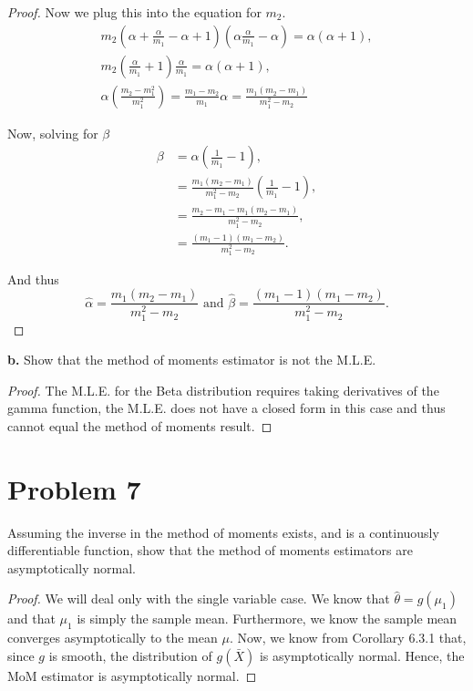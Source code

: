 \documentclass{article}
\begin{document}
\begin{proof}
    Now we plug this into the equation for $m_2$.
    \begin{gather*}
        m_2\left(\alpha + \frac{\alpha}{m_1} - \alpha + 1\right)(\alpha \frac{\alpha}{m_1} -\alpha)
        = \alpha(\alpha + 1), \\
        m_2\left(\frac{\alpha}{m_1} + 1\right)\frac{\alpha}{m_1}
        = \alpha(\alpha + 1), \\
        \alpha\left(\frac{m_2 - m_1^2}{m_1^2}\right) = \frac{m_1 - m_2}{m_1}
        \alpha = \frac{m_1(m_2 - m_1)}{m_1^2 - m_2}
    \end{gather*}

    Now, solving for $\beta$
    \begin{align*}
        \beta & = \alpha\left(\frac{1}{m_1} - 1\right),                             \\
              & = \frac{m_1(m_2 - m_1)}{m_1^2 - m_2}\left(\frac{1}{m_1} - 1\right), \\
              & = \frac{m_2 - m_1 - m_1(m_2 - m_1)}{m_1^2 - m_2},                   \\
              & = \frac{(m_1 - 1)(m_1 - m_2)}{m_1^2 - m_2}.
    \end{align*}

    And thus
    \begin{equation*}
        \hat{\alpha}  = \frac{m_1(m_2 - m_1)}{m_1^2 - m_2}
        \text{ and }
        \hat{\beta} = \frac{(m_1 - 1)(m_1 - m_2)}{m_1^2 - m_2}.
    \end{equation*}
\end{proof}

\textbf{b.}
Show that the method of moments estimator is not the M.L.E.

\begin{proof}
    The M.L.E. for the Beta distribution requires taking derivatives of the gamma
    function, the M.L.E. does not have a closed form in this case and thus cannot
    equal the method of moments result.
\end{proof}

\section*{Problem 7}
Assuming the inverse in the method of moments exists, and is a continuously
differentiable function, show that the method of moments estimators are
asymptotically normal.

\begin{proof}
    We will deal only with the single variable case.
    We know that $\hat{\theta} = g(\mu_1)$ and that $\mu_1$ is simply the
    sample mean. Furthermore, we know the sample mean converges asymptotically
    to the mean $\mu$. Now, we know from Corollary 6.3.1 that, since $g$
    is smooth, the distribution
    of $g(\bar{X})$ is asymptotically normal. Hence, the MoM estimator is
    asymptotically normal.
\end{proof}
\end{document}

